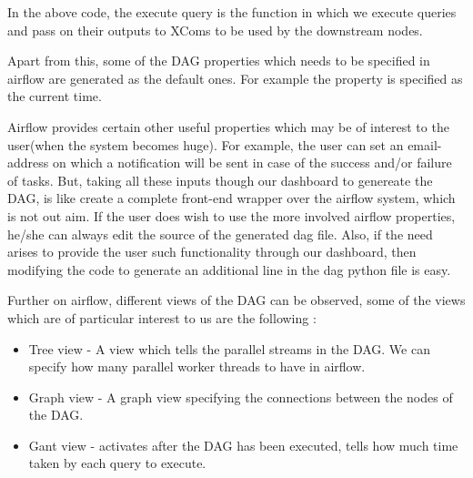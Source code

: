 \documentclass[letterpaper,10pt,english]{sphinxmanual}
\begin{document}
In the above code, the execute query is the function in which we execute queries and pass on their outputs to XComs to be used by the downstream nodes.

%
\begin{sphinxVerbatim}[commandchars=\\\{\}]
\PYG{p}{[}\PYG{p}{]}
\PYG{p}{[}\PYG{p}{]}\PYG{p}{[}\PYG{p}{]}  
\end{sphinxVerbatim}

Apart from this, some of the DAG properties which needs to be specified in airflow are generated as the default ones. For example the  property is specified as the current time.

Airflow provides certain other useful properties which may be of interest to the user(when the system becomes huge). For example, the user can set an email-address on which a notification will be sent in case of the success and/or failure of tasks. But, taking all these inputs though our dashboard to genereate the DAG, is like create a complete front-end wrapper over the airflow system, which is not out aim. If the user does wish to use the more involved airflow properties, he/she can always edit the source of the generated dag file. Also, if the need arises to provide the user such functionality through our dashboard, then modifying the code to generate an additional line in the dag python file is easy.

Further on airflow, different views of the DAG can be observed, some of the views which are of particular interest to us are the following :
\begin{itemize}
\item {} 
Tree view - A view which tells the parallel streams in the DAG. We can specify how many parallel worker threads to have in airflow.

\item {} 
Graph view - A graph view specifying the connections between the nodes of the DAG.

\item {} 
Gant view - activates after the DAG has been executed, tells how much time taken by each query to execute.

\end{itemize}
\end{document}
